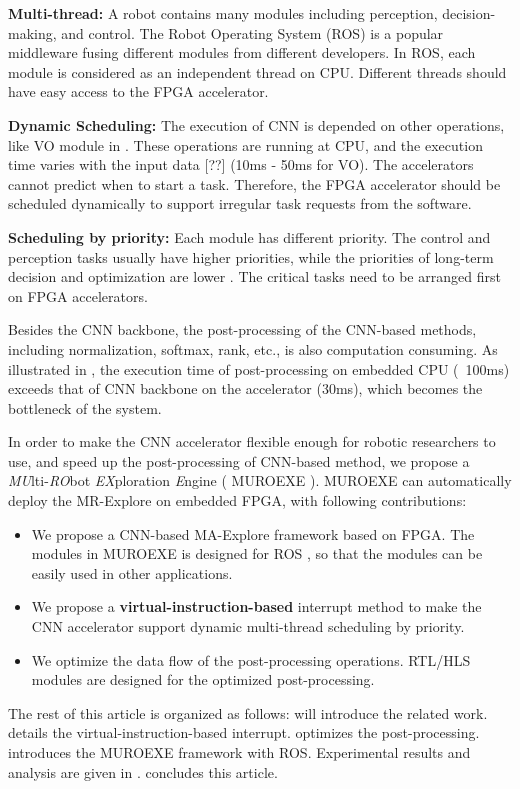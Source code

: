 \textbf{Multi-thread:} A robot contains many modules including perception, decision-making, and control. 
The Robot Operating System (ROS) \cite{quigley2009ros} is a popular middleware fusing different modules from different developers. 
In ROS, each module is considered as an independent thread on CPU. 
Different threads should have easy access to the FPGA accelerator.

\textbf{Dynamic Scheduling:} The execution of CNN is depended on other operations, like VO module in . 
These operations are running at CPU, and the execution time varies with the input data [??] (10ms - 50ms for VO). 
The accelerators cannot predict when to start a task. 
Therefore, the FPGA accelerator should be scheduled dynamically to support irregular task requests from the software.

\textbf{Scheduling by priority:} Each module has different priority. The control and perception tasks usually have higher priorities, while the priorities of long-term decision and optimization are lower \cite{RamsauerKLM17}. The critical tasks need to be arranged first on FPGA accelerators.

Besides the CNN backbone, the post-processing of the CNN-based methods, including normalization, softmax, rank, etc., is also computation consuming. As illustrated in , the execution time of post-processing on embedded CPU (~100ms) exceeds that of CNN backbone on the accelerator (30ms), which becomes the bottleneck of the system.


In order to make the CNN accelerator flexible enough for robotic researchers to use, and speed up the post-processing of CNN-based method, we propose a \textit{MU}lti-\textit{RO}bot \textit{EX}ploration \textit{E}ngine ( MUROEXE ). MUROEXE can automatically deploy the MR-Explore on embedded FPGA, with following contributions:

\begin{itemize}[leftmargin = 10 pt]
\item We propose a CNN-based MA-Explore framework based on FPGA. The modules in MUROEXE is designed for ROS \cite{quigley2009ros}, so that the modules can be easily used in other applications.
\item We propose a \textbf{virtual-instruction-based} interrupt method to make the CNN accelerator support dynamic multi-thread scheduling by priority.
\item We optimize the data flow of the post-processing operations. RTL/HLS modules are designed for the optimized post-processing.
\end{itemize}

The rest of this article is organized as follows:  will introduce the related work.  details the {virtual-instruction-based} interrupt.  optimizes the post-processing.  introduces the MUROEXE framework with ROS. Experimental results and analysis are given in .  concludes this article.